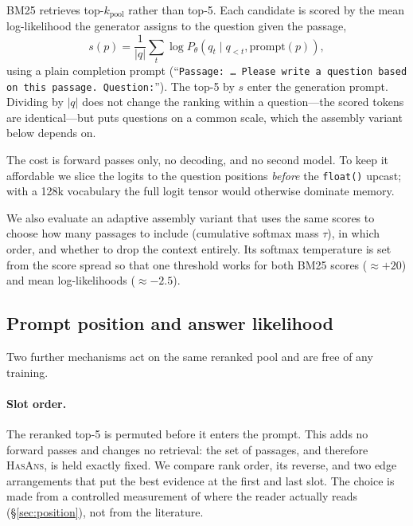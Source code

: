 \documentclass[11pt]{article}
\begin{document}
BM25 retrieves top-$k_{\text{pool}}$ rather than top-5. Each candidate is scored by the mean
log-likelihood the generator assigns to the question given the passage,
\begin{equation}
s(p) = \frac{1}{|q|}\sum_{t} \log P_\theta\!\left(q_t \mid q_{<t}, \text{prompt}(p)\right),
\end{equation}
using a plain completion prompt (``\texttt{Passage: \dots{} Please write a question based on
this passage. Question:}''). The top-5 by $s$ enter the generation prompt. Dividing by $|q|$
does not change the ranking within a question---the scored tokens are identical---but puts
questions on a common scale, which the assembly variant below depends on.

The cost is forward passes only, no decoding, and no second model. To keep it affordable we
slice the logits to the question positions \emph{before} the \texttt{float()} upcast; with a
128k vocabulary the full logit tensor would otherwise dominate memory.

We also evaluate an adaptive assembly variant that uses the same scores to choose how many
passages to include (cumulative softmax mass $\tau$), in which order, and whether to drop the
context entirely. Its softmax temperature is set from the score spread so that one threshold
works for both BM25 scores ($\approx +20$) and mean log-likelihoods ($\approx -2.5$).

\subsection{Prompt position and answer likelihood}
\label{sec:combined}

Two further mechanisms act on the same reranked pool and are free of any training.

\paragraph{Slot order.} The reranked top-5 is permuted before it enters the prompt. This adds
no forward passes and changes no retrieval: the set of passages, and therefore \textsc{HasAns},
is held exactly fixed. We compare rank order, its reverse, and two edge arrangements that put
the best evidence at the first and last slot. The choice is made from a controlled measurement
of where the reader actually reads (\S\ref{sec:position}), not from the literature.
\end{document}
